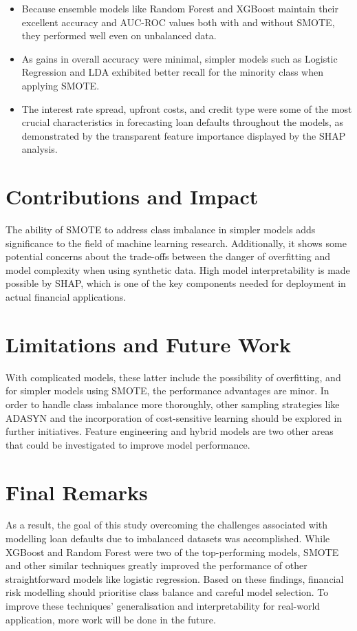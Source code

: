 \documentclass[12pt, a4paper,oneside]{book}
\numberwithin{equation}{section}
\begin{document}
\begin{itemize}
    \item Because ensemble models like Random Forest and XGBoost maintain their excellent accuracy and AUC-ROC values both with and without SMOTE, they performed well even on unbalanced data.
    \item As gains in overall accuracy were minimal, simpler models such as Logistic Regression and LDA exhibited better recall for the minority class when applying SMOTE.
    \item The interest rate spread, upfront costs, and credit type were some of the most crucial characteristics in forecasting loan defaults throughout the models, as demonstrated by the transparent feature importance displayed by the SHAP analysis.
\end{itemize}

\section{Contributions and Impact}
The ability of SMOTE to address class imbalance in simpler models adds significance to the field of machine learning research. Additionally, it shows some potential concerns about the trade-offs between the danger of overfitting and model complexity when using synthetic data. High model interpretability is made possible by SHAP, which is one of the key components needed for deployment in actual financial applications.

\section{ Limitations and Future Work}
With complicated models, these latter include the possibility of overfitting, and for simpler models using SMOTE, the performance advantages are minor. In order to handle class imbalance more thoroughly, other sampling strategies like ADASYN and the incorporation of cost-sensitive learning should be explored in further initiatives. Feature engineering and hybrid models are two other areas that could be investigated to improve model performance.

\section{Final Remarks}
As a result, the goal of this study overcoming the challenges associated with modelling loan defaults due to imbalanced datasets was accomplished. While XGBoost and Random Forest were two of the top-performing models, SMOTE and other similar techniques greatly improved the performance of other straightforward models like logistic regression. Based on these findings, financial risk modelling should prioritise class balance and careful model selection. To improve these techniques' generalisation and interpretability for real-world application, more work will be done in the future.



\end{document}
